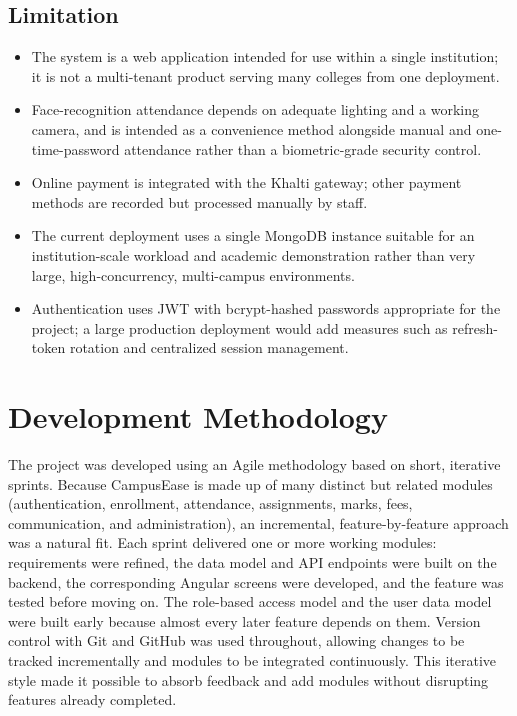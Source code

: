 \documentclass[12pt,a4paper]{report}
\begin{document}
\subsection{Limitation}

\begin{itemize}
    \item The system is a web application intended for use within a single institution; it is not a multi-tenant product serving many colleges from one deployment.
    \item Face-recognition attendance depends on adequate lighting and a working camera, and is intended as a convenience method alongside manual and one-time-password attendance rather than a biometric-grade security control.
    \item Online payment is integrated with the Khalti gateway; other payment methods are recorded but processed manually by staff.
    \item The current deployment uses a single MongoDB instance suitable for an institution-scale workload and academic demonstration rather than very large, high-concurrency, multi-campus environments.
    \item Authentication uses JWT with bcrypt-hashed passwords appropriate for the project; a large production deployment would add measures such as refresh-token rotation and centralized session management.
\end{itemize}

\section{Development Methodology}

The project was developed using an Agile methodology based on short, iterative sprints. Because CampusEase is made up of many distinct but related modules (authentication, enrollment, attendance, assignments, marks, fees, communication, and administration), an incremental, feature-by-feature approach was a natural fit. Each sprint delivered one or more working modules: requirements were refined, the data model and API endpoints were built on the backend, the corresponding Angular screens were developed, and the feature was tested before moving on. The role-based access model and the user data model were built early because almost every later feature depends on them. Version control with Git and GitHub was used throughout, allowing changes to be tracked incrementally and modules to be integrated continuously. This iterative style made it possible to absorb feedback and add modules without disrupting features already completed.
\end{document}
